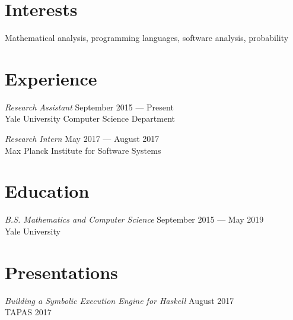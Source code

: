 \documentclass[margin]{res}
\begin{document}
 

 
\address{{\bf Address} \\ 17 Broadway 2L \\ New Haven, CT 06511}
 
\address{{\bf Contact} \\ \texttt{anton.xue@yale.edu} \\ (617) 755-5257}

\begin{resume} 
 
\section{Interests} 
Mathematical analysis, programming languages, software analysis, probability


\section{Experience}
\textit{Research Assistant} \hfill September 2015 --- Present \\
Yale University Computer Science Department

\textit{Research Intern} \hfill May 2017 --- August 2017 \\
Max Planck Institute for Software Systems

\section{Education} 
\textit{B.S. Mathematics and Computer Science} \hfill September 2015 --- May 2019 \\
Yale University



\section{Presentations}
\textit{Building a Symbolic Execution Engine for Haskell} \hfill August 2017 \\
TAPAS 2017


\end{resume}
\end{document}
